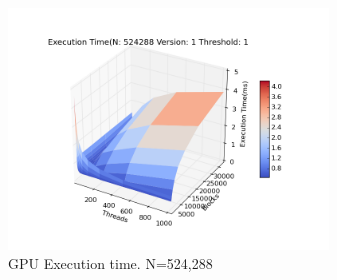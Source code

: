 \documentclass[conference]{IEEEtran}
\begin{document}
\begin{figure}[!t]
  \centering
  \includegraphics[width=8.5cm]{figure_5.png}      
  \caption{GPU Execution time. N=524,288}
  \label{fig:n524288v1}
\end{figure}

%
%
\end{document}
